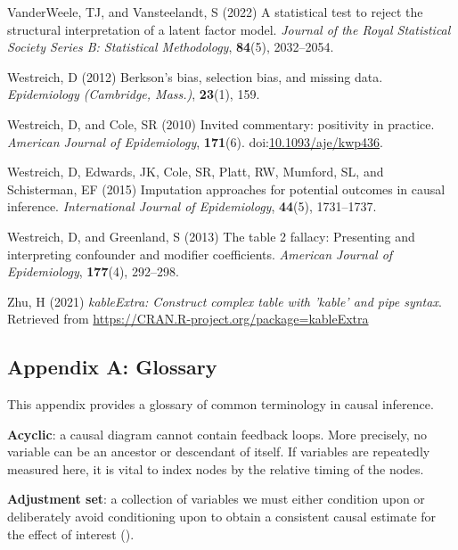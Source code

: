 \documentclass[
  singlecolumn]{article}
\newlength{\cslhangindent}
\newenvironment{CSLReferences}[2] %
 {\begin{list}{}{%
  \setlength{\itemindent}{0pt}
  \setlength{\leftmargin}{0pt}
  \setlength{\parsep}{0pt}
  \ifodd #1
   \setlength{\leftmargin}{\cslhangindent}
   \setlength{\itemindent}{-1\cslhangindent}
  \fi
  \setlength{\itemsep}{#2\baselineskip}}}
 {\end{list}}
\begin{document}
\begin{CSLReferences}{1}{0}
VanderWeele, TJ, and Vansteelandt, S (2022) A statistical test to reject
the structural interpretation of a latent factor model. \emph{Journal of
the Royal Statistical Society Series B: Statistical Methodology},
\textbf{84}(5), 2032--2054.

Westreich, D (2012) Berkson's bias, selection bias, and missing data.
\emph{Epidemiology (Cambridge, Mass.)}, \textbf{23}(1), 159.

Westreich, D, and Cole, SR (2010) Invited commentary: positivity in
practice. \emph{American Journal of Epidemiology}, \textbf{171}(6).
doi:\href{https://doi.org/10.1093/aje/kwp436}{10.1093/aje/kwp436}.

Westreich, D, Edwards, JK, Cole, SR, Platt, RW, Mumford, SL, and
Schisterman, EF (2015) Imputation approaches for potential outcomes in
causal inference. \emph{International Journal of Epidemiology},
\textbf{44}(5), 1731--1737.

Westreich, D, and Greenland, S (2013) The table 2 fallacy: Presenting
and interpreting confounder and modifier coefficients. \emph{American
Journal of Epidemiology}, \textbf{177}(4), 292--298.

Zhu, H (2021) \emph{kableExtra: Construct complex table with 'kable' and
pipe syntax}. Retrieved from
\url{https://CRAN.R-project.org/package=kableExtra}

\end{CSLReferences}

\newpage{}

\subsection{Appendix A: Glossary}\label{appendix-a}

This appendix provides a glossary of common terminology in causal
inference.

\textbf{Acyclic}: a causal diagram cannot contain feedback loops. More
precisely, no variable can be an ancestor or descendant of itself. If
variables are repeatedly measured here, it is vital to index nodes by
the relative timing of the nodes.

\textbf{Adjustment set}: a collection of variables we must either
condition upon or deliberately avoid conditioning upon to obtain a
consistent causal estimate for the effect of interest
().
\end{document}
